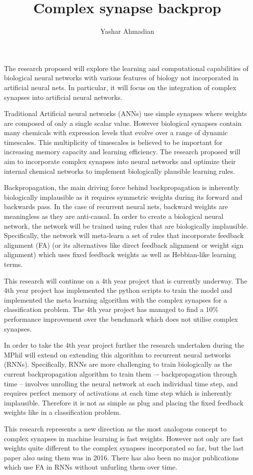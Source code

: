 \documentclass[11pt]{article}
\title{Complex synapse backprop}
\author[1]{Yashar Ahmadian}%
\theoremstyle{remark}%
\theoremstyle{definition}
\begin{document}
\maketitle






The research proposed will explore the learning and computational capabilities of biological neural networks with various features of biology not incorporated in artificial neural nets. In particular, it will focus on the integration of complex synapses into artificial neural networks.

Traditional Artificial neural networks (ANNs) use simple synapses where weights are composed of only a single scalar value. However biological synapses contain many chemicals with expression levels that  evolve over a range of dynamic timescales. This multiplicity of timescales is believed to be important for increasing memory capacity and learning efficiency. The research proposed will aim to incorporate complex synapses into neural networks and optimize their internal chemical networks to implement biologically plausible learning rules.

Backpropagation, the main driving force behind backpropagation is inherently biologically implausible  as it requires symmetric weights during its forward and backwards pass. In the case of recurrent neural nets, backward weights are meaningless as they are anti-causal. 
%
In order to create a biological neural network, the network will be trained using rules that are biologically implausible. Specifically, the network will meta-learn a set of rules that incorporate feedback alignment (FA) (or its alternatives like direct feedback alignment or weight sign alignment) which uses fixed feedback weights as well as Hebbian-like learning terms.

This research will continue on a 4th year project that is currently underway. The 4th year project has implemented the python scripts to train the model and implemented the meta learning algorithm with the complex synapses for a classification problem. The 4th year project has managed to find a 10\% performance improvement over the benchmark which does not utilise complex synapses.

In order to take the 4th year project further the research undertaken during the MPhil will extend on extending this algorithm to recurrent neural networks (RNNs). Specifically, RNNs are more challenging to train biologically as the current backpropagation algorithm to train them –- backpropagation through time -- involves unrolling the neural network at each individual time step, and requires perfect memory of activations at each time step which is inherently implausible. Therefore it is not as simple as plug and placing the fixed feedback weights like in a classification problem.

This research represents a new direction as the most analogous concept to complex synapses in machine learning is fast weights. However not only are fast weights quite different to the complex synapses incorporated so far, but the last paper also using them was in 2016. There has also been no major publications which use FA in RNNs without unfurling them over time.
\end{document}
